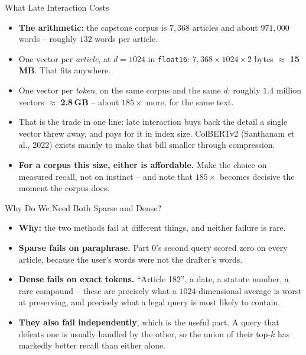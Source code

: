 \begin{frame}{What Late Interaction Costs}
\begin{itemize}
  \item \textbf{The arithmetic:} the capstone corpus is $7{,}368$ articles and about $971{,}000$ words -- roughly $132$ words per article.
  \pause
  \item One vector per \emph{article}, at $d = 1024$ in \texttt{float16}: $7{,}368 \times 1024 \times 2$ bytes $\approx$ \textbf{15\,MB}. That fits anywhere.
  \pause
  \item One vector per \emph{token}, on the same corpus and the same $d$: roughly $1.4$ million vectors $\approx$ \textbf{2.8\,GB} -- about $185\times$ more, for the same text.
  \pause
  \item That is the trade in one line: late interaction buys back the detail a single vector threw away, and pays for it in index size. ColBERTv2 (Santhanam et al., 2022) exists mainly to make that bill smaller through compression.
  \pause
  \item \textbf{For a corpus this size, either is affordable.} Make the choice on measured recall, not on instinct -- and note that $185\times$ becomes decisive the moment the corpus does.
\end{itemize}
\end{frame}

\begin{frame}{Why Do We Need Both Sparse and Dense?}
\begin{itemize}
  \item \textbf{Why:} the two methods fail at different things, and neither failure is rare.
  \pause
  \item \textbf{Sparse fails on paraphrase.} Part 0's second query scored zero on every article, because the user's words were not the drafter's words.
  \pause
  \item \textbf{Dense fails on exact tokens.} ``Article 182'', a date, a statute number, a rare compound -- these are precisely what a $1024$-dimensional average is worst at preserving, and precisely what a legal query is most likely to contain.
  \pause
  \item \textbf{They also fail independently}, which is the useful part. A query that defeats one is usually handled by the other, so the union of their top-$k$ has markedly better recall than either alone.
\end{itemize}
\end{frame}

